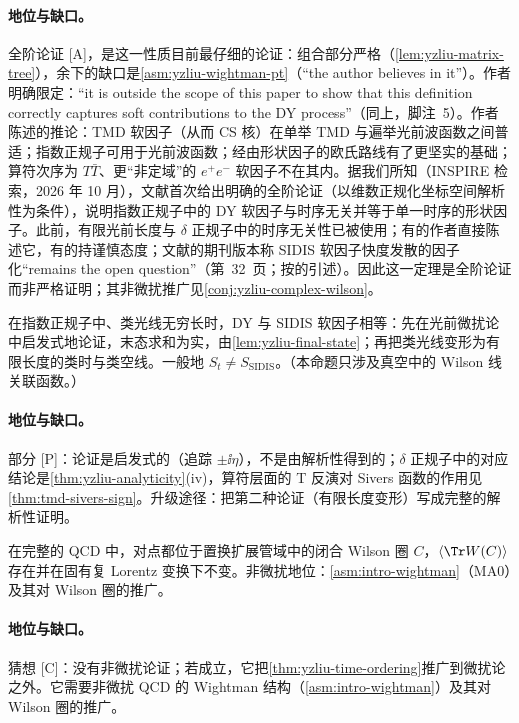 \paragraph{地位与缺口。}全阶论证 [A]，是这一性质目前最仔细的论证：组合部分严格（\cref{lem:yzliu-matrix-tree}），余下的缺口是\cref{asm:yzliu-wightman-pt}（“the author believes in it”\cite[第~4~节]{Liu:2023pjb}）。作者明确限定：“it is outside the scope of this paper to show that this definition correctly captures soft contributions to the DY process”（同上，脚注~5）。作者陈述的推论：TMD 软因子（从而 CS 核）在单举 TMD 与遍举光前波函数之间普适；指数正规子可用于光前波函数；经由形状因子的欧氏路线有了更坚实的基础；算符次序为 $T\bar T$、更“非定域”的 $e^+e^-$ 软因子不在其内。据我们所知（INSPIRE 检索，2026 年 10 月），文献\cite{Liu:2023pjb}首次给出明确的全阶论证（以维数正规化坐标空间解析性为条件），说明指数正规子中的 DY 软因子与时序无关并等于单一时序的形状因子。此前，有限光前长度与 $\delta$ 正规子中的时序无关性已被使用\cite{Vladimirov:2016dll,Vladimirov:2017ksc}；有的作者直接陈述它\cite{Collins2011,CollinsMetz2004,Echevarria:2015byo}，有的持谨慎态度\cite{Moult:2018jzp}；文献\cite{Vladimirov:2017ksc}的期刊版本称 SIDIS 软因子快度发散的因子化“remains the open question”（第~32~页；按\cite{Liu:2023pjb}的引述）。因此这一定理是全阶论证而非严格证明；其非微扰推广见\cref{conj:yzliu-complex-wilson}。


\begin{proposition}\label{prop:yzliu-dy-sidis-exp}
在指数正规子中、类光线无穷长时，DY 与 SIDIS 软因子相等\cite[附录~C]{Liu:2023pjb}：先在光前微扰论中启发式地论证，末态求和为实，由\cref{lem:yzliu-final-state}；再把类光线变形为有限长度的类时与类空线。一般地 $S_t\ne S_{\mathrm{SIDIS}}$。（本命题只涉及真空中的 Wilson 线关联函数。）
\end{proposition}

\paragraph{地位与缺口。}部分 [P]：论证是启发式的（追踪 $\pm\ii\eta$），不是由解析性得到的；$\delta$ 正规子中的对应结论是\cref{thm:yzliu-analyticity}(iv)，算符层面的 T 反演对 Sivers 函数的作用见\cref{thm:tmd-sivers-sign}。升级途径：把第二种论证（有限长度变形）写成完整的解析性证明。

\begin{conjecture}\label{conj:yzliu-complex-wilson}
在完整的 QCD 中，对点都位于置换扩展管域中的闭合 Wilson 圈 $C$，$\langle\Tr W(C)\rangle$ 存在并在固有复 Lorentz 变换下不变\cite[第~3.4~节]{Liu:2023pjb}。非微扰地位：\cref{asm:intro-wightman}（MA0）及其对 Wilson 圈的推广。
\end{conjecture}

\paragraph{地位与缺口。}猜想 [C]：没有非微扰论证；若成立，它把\cref{thm:yzliu-time-ordering}推广到微扰论之外。它需要非微扰 QCD 的 Wightman 结构（\cref{asm:intro-wightman}）及其对 Wilson 圈的推广。
